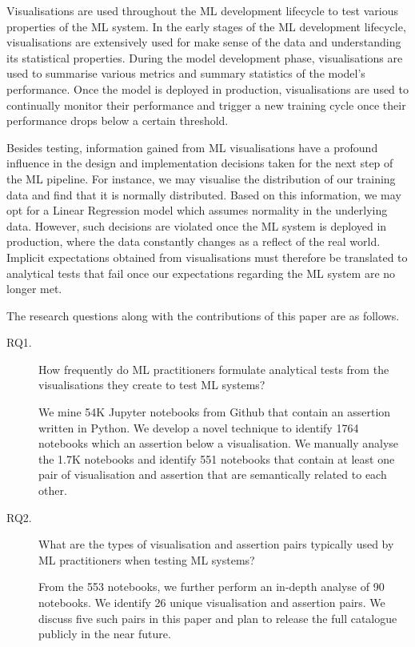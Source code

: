 \documentclass[acmsmall,screen,review,anonymous]{acmart}
\begin{document}
Visualisations are used throughout the ML development lifecycle to test various properties of the ML system. In the early stages of the ML development lifecycle, visualisations are extensively used for make sense of the data and understanding its statistical properties. During the model development phase, visualisations are used to summarise various metrics and summary statistics of the model's performance. Once the model is deployed in production, visualisations are used to continually monitor their performance and trigger a new training cycle once their performance drops below a certain threshold.

Besides testing, information gained from ML visualisations have a profound influence in the design and implementation decisions taken for the next step of the ML pipeline. For instance, we may visualise the distribution of our training data and find that it is normally distributed. Based on this information, we may opt for a Linear Regression model which assumes normality in the underlying data. However, such decisions are violated once the ML system is deployed in production, where the data constantly changes as a reflect of the real world. Implicit expectations obtained from visualisations must therefore be translated to analytical tests that fail once our expectations regarding the ML system are no longer met.


The research questions along with the contributions of this paper are as follows.
\begin{description}
\item[RQ1.] How frequently do ML practitioners formulate analytical tests from the visualisations they create to test ML systems?

We mine 54K Jupyter notebooks from Github that contain an assertion written in Python. We develop a novel technique to identify 1764 notebooks which an assertion below a visualisation. We manually analyse the 1.7K notebooks and identify 551 notebooks that contain at least one pair of visualisation and assertion that are semantically related to each other.

\item[RQ2.] What are the types of visualisation and assertion pairs typically used by ML practitioners when testing ML systems?

From the 553 notebooks, we further perform an in-depth analyse of 90 notebooks. We identify 26 unique visualisation and assertion pairs. We discuss five such pairs in this paper and plan to release the full catalogue publicly in the near future.

\end{description}
\end{document}
